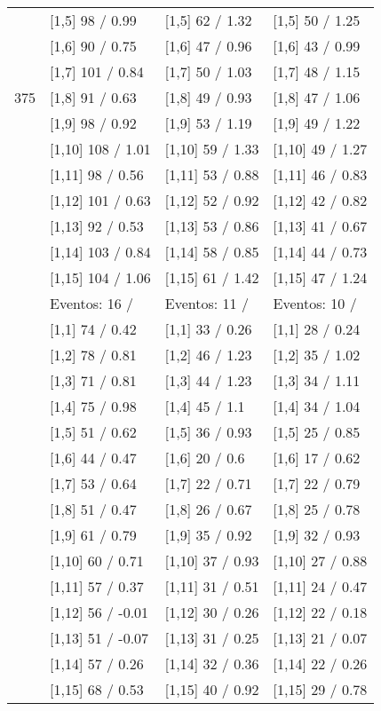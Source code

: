 \begin{table}
\begin{tabular}[t]{llll}
 & {}[1,5] 98  / 0.99 & {}[1,5] 62  / 1.32 & {}[1,5] 50  / 1.25\\
 & {}[1,6] 90  / 0.75 & {}[1,6] 47  / 0.96 & {}[1,6] 43  / 0.99\\
 & {}[1,7] 101  / 0.84 & {}[1,7] 50  / 1.03 & {}[1,7] 48  / 1.15\\
375 & {}[1,8] 91  / 0.63 & {}[1,8] 49  / 0.93 & {}[1,8] 47  / 1.06\\
\addlinespace
 & {}[1,9] 98  / 0.92 & {}[1,9] 53  / 1.19 & {}[1,9] 49  / 1.22\\
 & {}[1,10] 108  / 1.01 & {}[1,10] 59  / 1.33 & {}[1,10] 49  / 1.27\\
 & {}[1,11] 98  / 0.56 & {}[1,11] 53  / 0.88 & {}[1,11] 46  / 0.83\\
 & {}[1,12] 101  / 0.63 & {}[1,12] 52  / 0.92 & {}[1,12] 42  / 0.82\\
 & {}[1,13] 92  / 0.53 & {}[1,13] 53  / 0.86 & {}[1,13] 41  / 0.67\\
\addlinespace
 & {}[1,14] 103  / 0.84 & {}[1,14] 58  / 0.85 & {}[1,14] 44  / 0.73\\
 & {}[1,15] 104  / 1.06 & {}[1,15] 61  / 1.42 & {}[1,15] 47  / 1.24\\
 & Eventos:  16 / & Eventos:  11 / & Eventos:  10 /\\
 & {}[1,1] 74  / 0.42 & {}[1,1] 33  / 0.26 & {}[1,1] 28  / 0.24\\
 & {}[1,2] 78  / 0.81 & {}[1,2] 46  / 1.23 & {}[1,2] 35  / 1.02\\
\addlinespace
 & {}[1,3] 71  / 0.81 & {}[1,3] 44  / 1.23 & {}[1,3] 34  / 1.11\\
 & {}[1,4] 75  / 0.98 & {}[1,4] 45  / 1.1 & {}[1,4] 34  / 1.04\\
 & {}[1,5] 51  / 0.62 & {}[1,5] 36  / 0.93 & {}[1,5] 25  / 0.85\\
 & {}[1,6] 44  / 0.47 & {}[1,6] 20  / 0.6 & {}[1,6] 17  / 0.62\\
 & {}[1,7] 53  / 0.64 & {}[1,7] 22  / 0.71 & {}[1,7] 22  / 0.79\\
\addlinespace
500 & {}[1,8] 51  / 0.47 & {}[1,8] 26  / 0.67 & {}[1,8] 25  / 0.78\\
 & {}[1,9] 61  / 0.79 & {}[1,9] 35  / 0.92 & {}[1,9] 32  / 0.93\\
 & {}[1,10] 60  / 0.71 & {}[1,10] 37  / 0.93 & {}[1,10] 27  / 0.88\\
 & {}[1,11] 57  / 0.37 & {}[1,11] 31  / 0.51 & {}[1,11] 24  / 0.47\\
 & {}[1,12] 56  / -0.01 & {}[1,12] 30  / 0.26 & {}[1,12] 22  / 0.18\\
\addlinespace
 & {}[1,13] 51  / -0.07 & {}[1,13] 31  / 0.25 & {}[1,13] 21  / 0.07\\
 & {}[1,14] 57  / 0.26 & {}[1,14] 32  / 0.36 & {}[1,14] 22  / 0.26\\
 & {}[1,15] 68  / 0.53 & {}[1,15] 40  / 0.92 & {}[1,15] 29  / 0.78\\
\bottomrule
\end{tabular}
\end{table}
